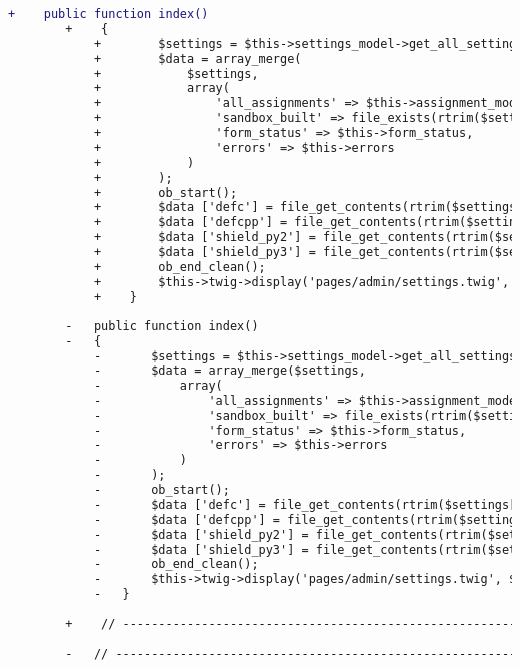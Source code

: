 \begin{lstlisting}[language=diff, caption=Perubahan pada kode Settings.php]
		+    public function index()
		+    {
			+        $settings = $this->settings_model->get_all_settings();
			+        $data = array_merge(
			+            $settings,
			+            array(
			+                'all_assignments' => $this->assignment_model->all_assignments(),
			+                'sandbox_built' => file_exists(rtrim($settings['tester_path'], '/').'/easysandbox/EasySandbox.so'),
			+                'form_status' => $this->form_status,
			+                'errors' => $this->errors
			+            )
			+        );
			+        ob_start();
			+        $data ['defc'] = file_get_contents(rtrim($settings['tester_path'], '/').'/shield/defc.h');
			+        $data ['defcpp'] = file_get_contents(rtrim($settings['tester_path'], '/').'/shield/defcpp.h');
			+        $data ['shield_py2'] = file_get_contents(rtrim($settings['tester_path'], '/').'/shield/shield_py2.py');
			+        $data ['shield_py3'] = file_get_contents(rtrim($settings['tester_path'], '/').'/shield/shield_py3.py');
			+        ob_end_clean();
			+        $this->twig->display('pages/admin/settings.twig', $data);
			+    }
		
		-	public function index()
		-	{
			-		$settings = $this->settings_model->get_all_settings();
			-		$data = array_merge($settings,
			-			array(
			-				'all_assignments' => $this->assignment_model->all_assignments(),
			-				'sandbox_built' => file_exists(rtrim($settings['tester_path'], '/').'/easysandbox/EasySandbox.so'),
			-				'form_status' => $this->form_status,
			-				'errors' => $this->errors
			-			)
			-		);
			-		ob_start();
			-		$data ['defc'] = file_get_contents(rtrim($settings['tester_path'], '/').'/shield/defc.h');
			-		$data ['defcpp'] = file_get_contents(rtrim($settings['tester_path'], '/').'/shield/defcpp.h');
			-		$data ['shield_py2'] = file_get_contents(rtrim($settings['tester_path'], '/').'/shield/shield_py2.py');
			-		$data ['shield_py3'] = file_get_contents(rtrim($settings['tester_path'], '/').'/shield/shield_py3.py');
			-		ob_end_clean();
			-		$this->twig->display('pages/admin/settings.twig', $data);
			-	}
		
		+    // ------------------------------------------------------------------------
		
		-	// ------------------------------------------------------------------------
		

\end{lstlisting}

